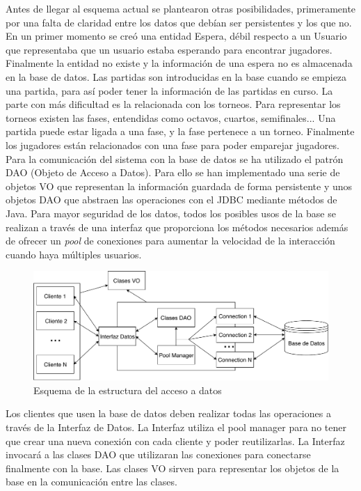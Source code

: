 Antes de llegar al esquema actual se plantearon otras posibilidades, primeramente por una falta de claridad entre los datos que debían ser persistentes y los que no. En un primer momento se creó una entidad Espera, débil respecto a un Usuario que representaba que un usuario estaba esperando para encontrar jugadores. Finalmente la entidad no existe y la información de una espera no es almacenada en la base de datos. Las partidas son introducidas en la base cuando se empieza una partida, para así poder tener la información de las partidas en curso. La parte con más dificultad es la relacionada con los torneos. Para representar los torneos existen las fases, entendidas como octavos, cuartos, semifinales... Una partida puede estar ligada a una fase, y la fase pertenece a un torneo. Finalmente los jugadores están relacionados con una fase para poder emparejar jugadores.\\

Para la comunicación del sistema con la base de datos se ha utilizado el patrón DAO (Objeto de Acceso a Datos). Para ello se han implementado una serie de objetos VO que representan la información guardada de forma persistente y unos objetos DAO que abstraen las operaciones con el JDBC mediante métodos de Java. Para mayor seguridad de los datos, todos los posibles usos de la base se realizan a través de una interfaz que proporciona los métodos necesarios además de ofrecer un \textit{pool} de conexiones para aumentar la velocidad de la interacción cuando haya múltiples usuarios.\\

\begin{figure}[H]
\centering
\includegraphics[scale = 0.5]{figuras/base_datos/Componentes.pdf}
\caption{Esquema de la estructura del acceso a datos}
\label{fig:componentesbases}
\end{figure}

Los clientes que usen la base de datos deben realizar todas las operaciones a través de la Interfaz de Datos. La Interfaz utiliza el pool manager para no tener que crear una nueva conexión con cada cliente y poder reutilizarlas. La Interfaz invocará a las clases DAO que utilizaran las conexiones para conectarse finalmente con la base. Las clases VO sirven para representar los objetos de la base en la comunicación entre las clases.\\

